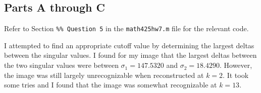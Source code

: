 \documentclass[12pt]{article}
\newcommand{\code}[1]{\texttt{#1}}
\begin{document}
\subsection*{Parts A through C}

Refer to Section \code{\%\% Question 5} in the \code{math425hw7.m} file for the relevant code.

I attempted to find an appropriate cutoff value by determining the largest deltas between the singular values. I found for my image that the largest deltas between the two singular values were between $\sigma_1 =147.5320$ and $\sigma_2 = 18.4290$. However, the image was still largely unrecognizable when reconstructed at $k=2$. It took some tries and I found that the image was somewhat recognizable at $k=13$.
\end{document}
